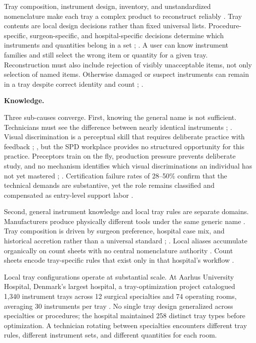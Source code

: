 \documentclass[10pt,a4paper]{article}
\begin{document}
Tray composition, instrument design, inventory, and unstandardized nomenclature
make each tray a complex product to reconstruct reliably
\cite{alfred-et-al-2021}. Tray contents are local design decisions rather than
fixed universal lists. Procedure-specific, surgeon-specific, and
hospital-specific decisions determine which instruments and quantities belong in
a set \cite{dos-santos-et-al-2021};
\cite{ahmadi-et-al-2023}. A user can know
instrument families and still select the wrong item or quantity for a given
tray. Reconstruction must also include rejection of visibly unacceptable items,
not only selection of named items. Otherwise damaged or suspect instruments can
remain in a tray despite correct identity and count
\cite{cdc};
\cite{pennsylvania-patient-safety-authority-2006}.

\textbf{Knowledge.}

Three sub-causes converge. First, knowing the general name is not sufficient.
Technicians must see the difference between nearly identical instruments
\cite{castillo-gutierrez-2025};
\cite{nichol-et-al-2024}. Visual discrimination is
a perceptual skill that requires deliberate practice with feedback
\cite{fast-et-al-2019};
\cite{shreckengost-et-al-2022}, but the SPD workplace
provides no structured opportunity for this practice. Preceptors train on the
fly, production pressure prevents deliberate study, and no mechanism identifies
which visual discriminations an individual has not yet mastered
\cite{nichol-et-al-2024};
\cite{alfred-et-al-2021}. Certification failure rates of
28--50\% confirm that the technical demands are substantive, yet the role
remains classified and compensated as entry-level support labor
\cite{hspa-crcst-accessed-2026}.

Second, general instrument knowledge and local tray rules are separate domains.
Manufacturers produce physically different tools under the same generic name
\cite{nadeau-2024}. Tray composition is driven by surgeon preference, hospital
case mix, and historical accretion rather than a universal standard
\cite{dos-santos-et-al-2021};
\cite{ahmadi-et-al-2023}. Local aliases accumulate
organically on count sheets with no central nomenclature authority
\cite{alfred-et-al-2021}. Count sheets encode tray-specific rules that exist
only in that hospital's workflow \cite{nadeau-2024}.

Local tray configurations operate at substantial scale. At Aarhus University Hospital, Denmark's largest hospital, a tray-optimization project catalogued 1,340 instrument trays across 12 surgical specialties and 74 operating rooms, averaging 30 instruments per tray \cite{rubak-et-al-2024}. No single tray design generalized across specialties or procedures; the hospital maintained 258 distinct tray types before optimization. A technician rotating between specialties encounters different tray rules, different instrument sets, and different quantities for each room.
\end{document}
